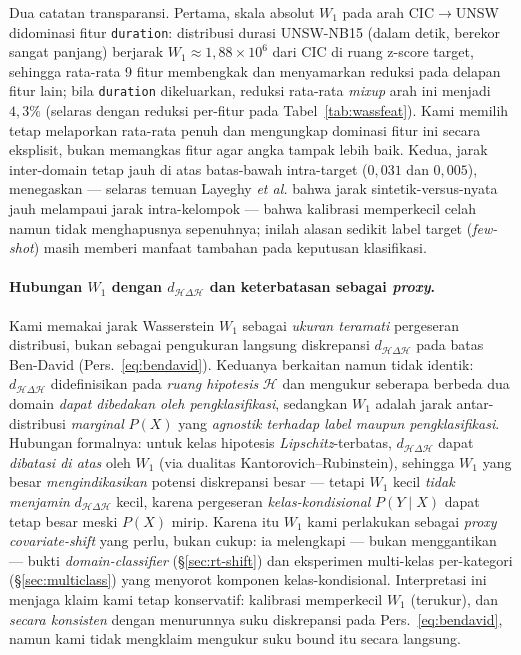 \documentclass[11pt,a4paper]{article}
\begin{document}
Dua catatan transparansi. Pertama, skala absolut $W_1$ pada arah
CIC$\rightarrow$UNSW didominasi fitur \texttt{duration}: distribusi durasi
UNSW-NB15 (dalam detik, berekor sangat panjang) berjarak $W_1 \approx
1{,}88\times10^{6}$ dari CIC di ruang z-score target, sehingga rata-rata 9 fitur
membengkak dan menyamarkan reduksi pada delapan fitur lain; bila \texttt{duration}
dikeluarkan, reduksi rata-rata \emph{mixup} arah ini menjadi $4{,}3\%$ (selaras
dengan reduksi per-fitur pada Tabel~\ref{tab:wassfeat}). Kami memilih tetap
melaporkan rata-rata penuh dan mengungkap dominasi fitur ini secara eksplisit,
bukan memangkas fitur agar angka tampak lebih baik. Kedua, jarak inter-domain
tetap jauh di atas batas-bawah intra-target ($0{,}031$ dan $0{,}005$),
menegaskan --- selaras temuan Layeghy \emph{et al.} bahwa jarak
sintetik-versus-nyata jauh melampaui jarak intra-kelompok --- bahwa kalibrasi
memperkecil celah namun tidak menghapusnya sepenuhnya; inilah alasan sedikit
label target (\emph{few-shot}) masih memberi manfaat tambahan pada keputusan
klasifikasi.

\paragraph{Hubungan $W_1$ dengan $d_{\mathcal{H}\Delta\mathcal{H}}$ dan keterbatasan
sebagai \emph{proxy}.} Kami memakai jarak Wasserstein $W_1$ sebagai \emph{ukuran
teramati} pergeseran distribusi, bukan sebagai pengukuran langsung diskrepansi
$d_{\mathcal{H}\Delta\mathcal{H}}$ pada batas Ben-David (Pers.~\eqref{eq:bendavid}).
Keduanya berkaitan namun tidak identik: $d_{\mathcal{H}\Delta\mathcal{H}}$
didefinisikan pada \emph{ruang hipotesis} $\mathcal{H}$ dan mengukur seberapa
berbeda dua domain \emph{dapat dibedakan oleh pengklasifikasi}, sedangkan $W_1$
adalah jarak antar-distribusi \emph{marginal} $P(X)$ yang \emph{agnostik terhadap
label maupun pengklasifikasi}. Hubungan formalnya: untuk kelas hipotesis
\emph{Lipschitz}-terbatas, $d_{\mathcal{H}\Delta\mathcal{H}}$ dapat \emph{dibatasi
di atas} oleh $W_1$ (via dualitas Kantorovich--Rubinstein), sehingga $W_1$ yang
besar \emph{mengindikasikan} potensi diskrepansi besar --- tetapi $W_1$ kecil
\emph{tidak menjamin} $d_{\mathcal{H}\Delta\mathcal{H}}$ kecil, karena pergeseran
\emph{kelas-kondisional} $P(Y\mid X)$ dapat tetap besar meski $P(X)$ mirip. Karena
itu $W_1$ kami perlakukan sebagai \emph{proxy covariate-shift} yang perlu, bukan
cukup: ia melengkapi --- bukan menggantikan --- bukti \emph{domain-classifier}
(\S\ref{sec:rt-shift}) dan eksperimen multi-kelas per-kategori
(\S\ref{sec:multiclass}) yang menyorot komponen kelas-kondisional. Interpretasi ini
menjaga klaim kami tetap konservatif: kalibrasi memperkecil $W_1$ (terukur), dan
\emph{secara konsisten} dengan menurunnya suku diskrepansi pada Pers.~\eqref{eq:bendavid},
namun kami tidak mengklaim mengukur suku bound itu secara langsung.
\end{document}
